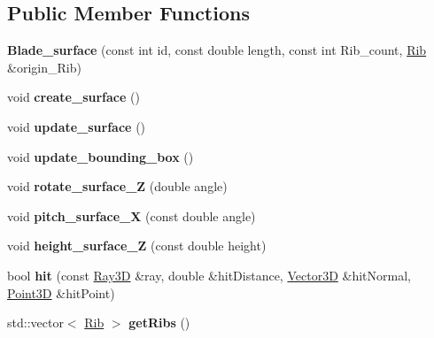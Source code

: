 \subsection*{Public Member Functions}
\begin{DoxyCompactItemize}
\item 
\hypertarget{class_blade__surface_a0c1a5fa3ea94afa451043ce70d3d7c1e}{}\label{class_blade__surface_a0c1a5fa3ea94afa451043ce70d3d7c1e} 
{\bfseries Blade\+\_\+surface} (const int id, const double length, const int Rib\+\_\+count, \hyperlink{class_rib}{Rib} \&origin\+\_\+\+Rib)
\item 
\hypertarget{class_blade__surface_a160959f632ad73eff846aeea81aa84ae}{}\label{class_blade__surface_a160959f632ad73eff846aeea81aa84ae} 
void {\bfseries create\+\_\+surface} ()
\item 
\hypertarget{class_blade__surface_a34d1f584602a5513960b0647a337232b}{}\label{class_blade__surface_a34d1f584602a5513960b0647a337232b} 
void {\bfseries update\+\_\+surface} ()
\item 
\hypertarget{class_blade__surface_a1eddf9a97aa9c2f4f399d03623e9fb6c}{}\label{class_blade__surface_a1eddf9a97aa9c2f4f399d03623e9fb6c} 
void {\bfseries update\+\_\+bounding\+\_\+box} ()
\item 
\hypertarget{class_blade__surface_a8d08aa093ce9eb861d5061303cc35a3b}{}\label{class_blade__surface_a8d08aa093ce9eb861d5061303cc35a3b} 
void {\bfseries rotate\+\_\+surface\+\_\+Z} (double angle)
\item 
\hypertarget{class_blade__surface_a384b9627c130a436d944264fb001d25b}{}\label{class_blade__surface_a384b9627c130a436d944264fb001d25b} 
void {\bfseries pitch\+\_\+surface\+\_\+X} (const double angle)
\item 
\hypertarget{class_blade__surface_a6823c31d12449828939ddc88ddb23705}{}\label{class_blade__surface_a6823c31d12449828939ddc88ddb23705} 
void {\bfseries height\+\_\+surface\+\_\+Z} (const double height)
\item 
\hypertarget{class_blade__surface_a1d4bc10f18e1ee2002a3fa1b5b0c0cb7}{}\label{class_blade__surface_a1d4bc10f18e1ee2002a3fa1b5b0c0cb7} 
bool {\bfseries hit} (const \hyperlink{class_ray3_d}{Ray3D} \&ray, double \&hit\+Distance, \hyperlink{class_vector3_d}{Vector3D} \&hit\+Normal, \hyperlink{class_point3_d}{Point3D} \&hit\+Point)
\item 
\hypertarget{class_blade__surface_a9d55669ccf429e408ff492cfecf52b6b}{}\label{class_blade__surface_a9d55669ccf429e408ff492cfecf52b6b} 
std\+::vector$<$ \hyperlink{class_rib}{Rib} $>$ {\bfseries get\+Ribs} ()

\end{DoxyCompactItemize}
